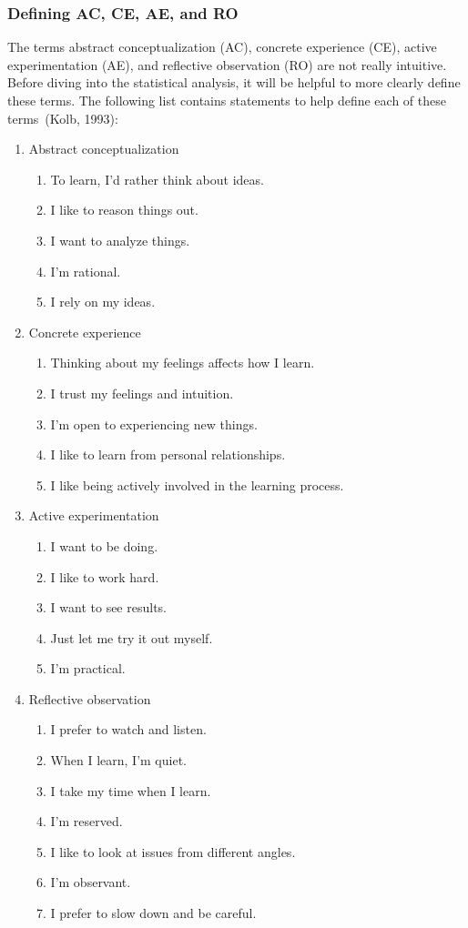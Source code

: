 \subsubsection{Defining AC, CE, AE, and RO}
The terms abstract conceptualization (AC), concrete experience (CE), active experimentation (AE), and reflective observation (RO) are not really intuitive. Before diving into the statistical analysis, it will be helpful to more clearly define these terms. The following list contains statements to help define each of these terms~(Kolb, 1993):
\begin{enumerate}
  \item Abstract conceptualization
  \begin{enumerate}
    \item To learn, I'd rather think about ideas.
    \item I like to reason things out.
    \item I want to analyze things.
    \item I'm rational.
    \item I rely on my ideas.
  \end{enumerate}
  \item Concrete experience
  \begin{enumerate}
    \item Thinking about my feelings affects how I learn.
    \item I trust my feelings and intuition.
    \item I'm open to experiencing new things.
    \item I like to learn from personal relationships.
    \item I like being actively involved in the learning process.
  \end{enumerate}
  \item Active experimentation
  \begin{enumerate}
    \item I want to be doing.
    \item I like to work hard.
    \item I want to see results.
    \item Just let me try it out myself.
    \item I'm practical.
  \end{enumerate}
  \item Reflective observation
  \begin{enumerate}
    \item I prefer to watch and listen.
    \item When I learn, I'm quiet.
    \item I take my time when I learn.
    \item I'm reserved.
    \item I like to look at issues from different angles.
    \item I'm observant.
    \item I prefer to slow down and be careful.
  \end{enumerate}
\end{enumerate}

